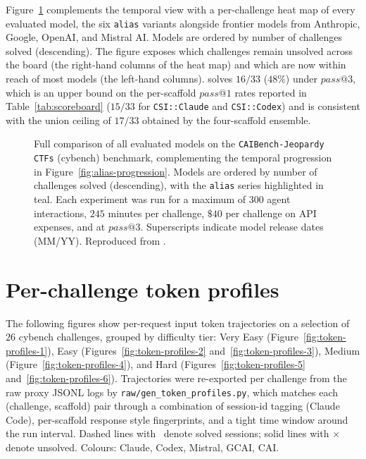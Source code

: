 Figure~\ref{fig:alias-heatmap-full} complements the temporal view with a per-challenge heat map of every evaluated model, the six \texttt{alias} variants alongside frontier models from Anthropic, Google, OpenAI, and Mistral AI. Models are ordered by number of challenges solved (descending). The figure exposes which challenges remain unsolved across the board (the right-hand columns of the heat map) and which are now within reach of most models (the left-hand columns). \aliasmini{} solves $16/33$ ($48\%$) under $pass@3$, which is an upper bound on the per-scaffold $pass@1$ rates reported in Table~\ref{tab:scoreboard} ($15/33$ for \texttt{CSI::Claude} and \texttt{CSI::Codex}) and is consistent with the union ceiling of $17/33$ obtained by the four-scaffold ensemble.

\begin{figure}[t]
\centering
\resizebox{\textwidth}{!}{}
\caption{Full comparison of all evaluated models on the \texttt{CAIBench-Jeopardy CTFs} (cybench) benchmark, complementing the temporal progression in Figure~\ref{fig:alias-progression}. Models are ordered by number of challenges solved (descending), with the \texttt{alias} series highlighted in teal. Each experiment was run for a maximum of $300$ agent interactions, $245$ minutes per challenge, $\$40$ per challenge on API expenses, and at $pass@3$. Superscripts indicate model release dates (MM/YY). Reproduced from \cite{mayoralvilchescybersuper2026}.}
\label{fig:alias-heatmap-full}
\end{figure}

\FloatBarrier
\section{Per-challenge token profiles}\label{app:token-profiles}

The following figures show per-request input token trajectories on a selection of $26$ cybench challenges, grouped by difficulty tier: Very Easy (Figure~\ref{fig:token-profiles-1}), Easy (Figures~\ref{fig:token-profiles-2} and~\ref{fig:token-profiles-3}), Medium (Figure~\ref{fig:token-profiles-4}), and Hard (Figures~\ref{fig:token-profiles-5} and~\ref{fig:token-profiles-6}). Trajectories were re-exported per challenge from the raw proxy JSONL logs by \texttt{raw/gen\_token\_profiles.py}, which matches each (challenge, scaffold) pair through a combination of session-id tagging (Claude Code), per-scaffold response style fingerprints, and a tight time window around the run interval. Dashed lines with \checkmark\ denote solved sessions; solid lines with $\times$ denote unsolved. Colours: \textcolor{cc_color}{Claude}, \textcolor{codex_color}{Codex}, \textcolor{mistral_vibe}{Mistral}, \textcolor{gcai_color}{GCAI}, \textcolor{cai_orange}{CAI}.

